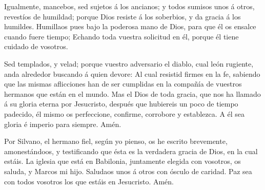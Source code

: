  Igualmente, mancebos, sed sujetos á los ancianos; y todos
sumisos unos á otros, revestíos de humildad; porque Dios resiste á los
soberbios, y da gracia á los humildes.  Humillaos pues bajo
la poderosa mano de Dios, para que él os ensalce cuando fuere tiempo;
 Echando toda vuestra solicitud en él, porque él tiene
cuidado de vosotros.

 Sed templados, y velad; porque vuestro adversario el
diablo, cual león rugiente, anda alrededor buscando á quien devore:
 Al cual resistid firmes en la fe, sabiendo que las mismas
aflicciones han de ser cumplidas en la compañía de vuestros hermanos que
están en el mundo.  Mas el Dios de toda gracia, que nos ha
llamado á su gloria eterna por Jesucristo, después que hubiereis un poco
de tiempo padecido, él mismo os perfeccione, confirme, corrobore y
establezca.  A él sea gloria é imperio para siempre. Amén.

 Por Silvano, el hermano fiel, según yo pienso, os he
escrito brevemente, amonestándoos, y testificando que ésta es la
verdadera gracia de Dios, en la cual estáis.  La iglesia
que está en Babilonia, juntamente elegida con vosotros, os saluda, y
Marcos mi hijo.  Saludaos unos á otros con ósculo de
caridad. Paz sea con todos vosotros los que estáis en Jesucristo. Amén.

